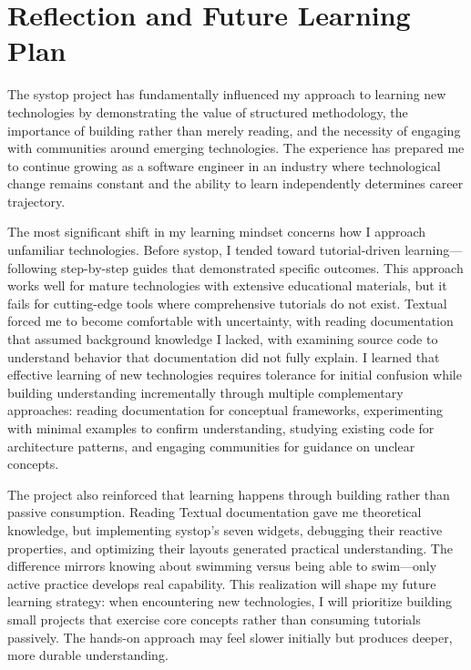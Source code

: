 \documentclass[12pt,a4paper]{article}
\begin{document}
\section*{Reflection and Future Learning Plan}

The systop project has fundamentally influenced my approach to learning new technologies by demonstrating the value of structured methodology, the importance of building rather than merely reading, and the necessity of engaging with communities around emerging technologies. The experience has prepared me to continue growing as a software engineer in an industry where technological change remains constant and the ability to learn independently determines career trajectory.

The most significant shift in my learning mindset concerns how I approach unfamiliar technologies. Before systop, I tended toward tutorial-driven learning—following step-by-step guides that demonstrated specific outcomes. This approach works well for mature technologies with extensive educational materials, but it fails for cutting-edge tools where comprehensive tutorials do not exist. Textual forced me to become comfortable with uncertainty, with reading documentation that assumed background knowledge I lacked, with examining source code to understand behavior that documentation did not fully explain. I learned that effective learning of new technologies requires tolerance for initial confusion while building understanding incrementally through multiple complementary approaches: reading documentation for conceptual frameworks, experimenting with minimal examples to confirm understanding, studying existing code for architecture patterns, and engaging communities for guidance on unclear concepts.

The project also reinforced that learning happens through building rather than passive consumption. Reading Textual documentation gave me theoretical knowledge, but implementing systop's seven widgets, debugging their reactive properties, and optimizing their layouts generated practical understanding. The difference mirrors knowing about swimming versus being able to swim—only active practice develops real capability. This realization will shape my future learning strategy: when encountering new technologies, I will prioritize building small projects that exercise core concepts rather than consuming tutorials passively. The hands-on approach may feel slower initially but produces deeper, more durable understanding.
\end{document}
